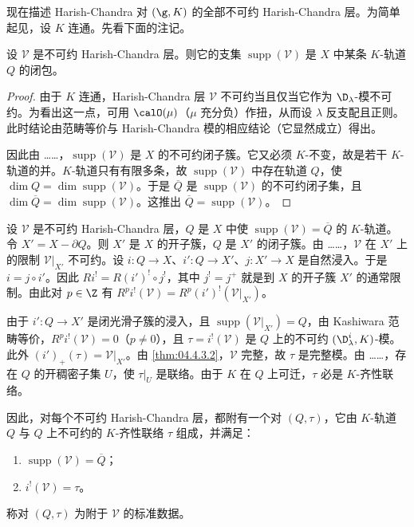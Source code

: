 现在描述 Harish-Chandra 对 $(\g,K)$ 的全部不可约 Harish-Chandra 层。为简单起见，设 $K$ 连通。先看下面的注记。

\begin{lemma}\label{lem:04.4.5.1}
设 $\mathcal{V}$ 是不可约 Harish-Chandra 层。则它的支集 $\operatorname{supp}(\mathcal{V})$ 是 $X$ 中某条 $K$-轨道 $Q$ 的闭包。
\end{lemma}

\begin{proof}
由于 $K$ 连通，Harish-Chandra 层 $\mathcal{V}$ 不可约当且仅当它作为 $\D_\lambda$-模不可约。为看出这一点，可用 $\calO(\mu)$（$\mu$ 充分负）作扭，从而设 $\lambda$ 反支配且正则。此时结论由范畴等价与 Harish-Chandra 模的相应结论（它显然成立）得出。

因此由 ……，$\operatorname{supp}(\mathcal{V})$ 是 $X$ 的不可约闭子簇。它又必须 $K$-不变，故是若干 $K$-轨道的并。$K$-轨道只有有限多条，故 $\operatorname{supp}(\mathcal{V})$ 中存在轨道 $Q$，使 $\dim Q=\dim\operatorname{supp}(\mathcal{V})$。于是 $\overline Q$ 是 $\operatorname{supp}(\mathcal{V})$ 的不可约闭子集，且 $\dim\overline Q=\dim\operatorname{supp}(\mathcal{V})$。这推出 $\overline Q=\operatorname{supp}(\mathcal{V})$。
\end{proof}

设 $\mathcal{V}$ 是不可约 Harish-Chandra 层，$Q$ 是 $X$ 中使 $\operatorname{supp}(\mathcal{V})=\overline Q$ 的 $K$-轨道。令 $X'=X-\partial Q$。则 $X'$ 是 $X$ 的开子簇，$Q$ 是 $X'$ 的闭子簇。由 ……，$\mathcal{V}$ 在 $X'$ 上的限制 $\mathcal{V}|_{X'}$ 不可约。设 $i:Q\to X$、$i':Q\to X'$、$j:X'\to X$ 是自然浸入。于是 $i=j\circ i'$。因此 $Ri^!=R(i')^!\circ j^!$，其中 $j^!=j^+$ 就是到 $X$ 的开子簇 $X'$ 的通常限制。由此对 $p\in\Z$ 有 $R^pi^!(\mathcal{V})=R^p(i')^!(\mathcal{V}|_{X'})$。

由于 $i':Q\to X'$ 是闭光滑子簇的浸入，且 $\operatorname{supp}(\mathcal{V}|_{X'})=Q$，由 Kashiwara 范畴等价，$R^pi^!(\mathcal{V})=0$（$p\neq 0$），且 $\tau=i^!(\mathcal{V})$ 是 $Q$ 上的不可约 $(\D^i_\lambda,K)$-模。此外 $(i')_+(\tau)=\mathcal{V}|_{X'}$。由 \ref{thm:04.4.3.2}，$\mathcal{V}$ 完整，故 $\tau$ 是完整模。由 ……，存在 $Q$ 的开稠密子集 $U$，使 $\tau|_U$ 是联络。由于 $K$ 在 $Q$ 上可迁，$\tau$ 必是 $K$-齐性联络。

因此，对每个不可约 Harish-Chandra 层，都附有一个对 $(Q,\tau)$，它由 $K$-轨道 $Q$ 与 $Q$ 上不可约的 $K$-齐性联络 $\tau$ 组成，并满足：
\begin{enumerate}[label=(\roman*)]
\item $\operatorname{supp}(\mathcal{V})=\overline Q$；
\item $i^!(\mathcal{V})=\tau$。
\end{enumerate}
称对 $(Q,\tau)$ 为附于 $\mathcal{V}$ 的标准数据。

